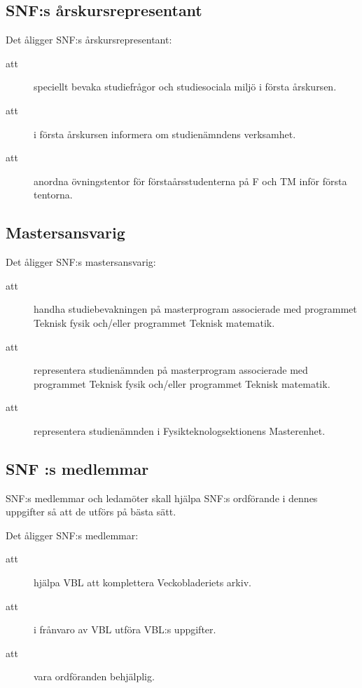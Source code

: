 \documentclass[a4paper]{article}
\begin{document}
\begin{foreningenv}{\forening{}}
    \subsection{SNF:s årskursrepresentant}
        Det åligger SNF:s årskursrepresentant:
    \begin{description}
        \item[att] speciellt bevaka studiefrågor och studiesociala miljö i första årskursen.
        \item[att] i första årskursen informera om studienämndens verksamhet.
        \item[att] anordna övningstentor för förstaårsstudenterna på F och TM inför första tentorna.
    \end{description}
    
    \subsection{Mastersansvarig}
    Det åligger SNF:s mastersansvarig:
    \begin{description}
          \item [att] handha studiebevakningen på masterprogram associerade med programmet Teknisk fysik och/eller programmet Teknisk matematik.
          \item [att] representera studienämnden på masterprogram associerade med
          programmet Teknisk fysik och/eller programmet Teknisk matematik.
          \item [att] representera studienämnden i Fysikteknologsektionens Masterenhet.
    \end{description}
        
    \subsection{SNF :s medlemmar}
    SNF:s medlemmar och ledamöter skall hjälpa SNF:s ordförande i dennes uppgifter så att de utförs på bästa sätt.
    
    Det åligger SNF:s medlemmar:
    \begin{description}
        \item[att] hjälpa VBL att komplettera Veckobladeriets arkiv.
        \item[att] i frånvaro av VBL utföra VBL:s uppgifter.
        \item[att] vara ordföranden behjälplig.
    \end{description}
\end{foreningenv}
\end{document}
